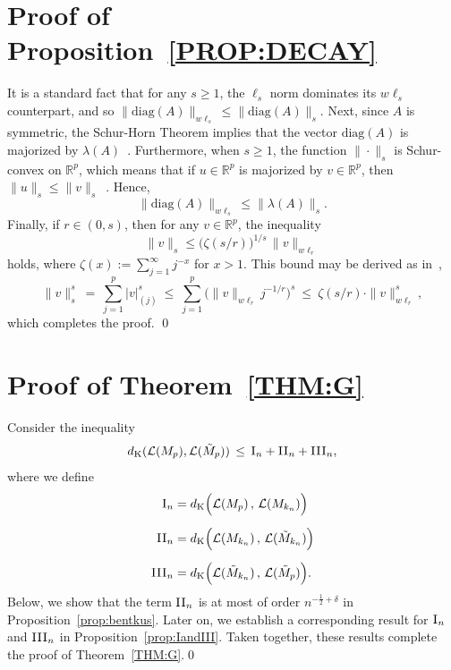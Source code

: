 \documentclass[aos,preprint]{imsart}
\numberwithin{equation}{section}
\theoremstyle{plain}
\newcommand{\R}{\mathbb{R}}
\newcommand{\I}{\textsc{I}}
\newcommand{\II}{\textsc{II}}
\newcommand{\III}{\textsc{III}}
\newcommand{\1}{{\bf{1}}}
\newcommand{\0}{\mathbf{0}}
\begin{document}
\appendix


\section{Proof of Proposition~\ref{PROP:DECAY}} \label{app:intro}
\proof 
It is a standard fact that for any $s\geq 1$, the $\ell_s$ norm dominates its $w\ell_s$ counterpart, and so
$\|\text{diag}(A)\|_{w\ell_s}\leq \|\text{diag}(A)\|_s$.
Next, since $A$ is symmetric, the Schur-Horn Theorem implies that the vector $\text{diag}(A)$ is majorized by $\lambda(A)$~\cite[p.300]{Olkin:2011}. Furthermore, when $s\geq 1$, the function $\|\cdot \|_s$ is Schur-convex on $\R^p$, which means that if  $u\in\R^p$ is majorized by $v\in\R^p$, then $\|u\|_s\leq \|v\|_s$~\cite[p.138]{Olkin:2011}. Hence,
%
$$\|\text{diag}(A)\|_{w\ell_s}\leq \| \lambda(A)\|_s.$$
%
Finally, if $r\in(0,s)$, then for any $v\in\R^p$, the inequality 
$$\|v\|_s \leq \big(\zeta(s/r)\big)^{1/s}\,\|v\|_{w\ell_r}$$ 
holds, where $\zeta(x):=\sum_{j=1}^{\infty}j^{-x}$ for $x>1$. This bound may be derived as in~\citep[p.257]{Johnstone:2017}, 
%
$$\|v\|_s^s \ = \ \sum_{j=1}^p |v|_{(j)}^s \ \leq \ \sum_{j=1}^p \big(\|v\|_{w\ell_r} j^{-1/r}\big)^s \ \leq \ \zeta(s/r)\cdot \|v\|_{w\ell_r}^s,
$$
which completes the proof.
\qed
%
%
%
%
%

\section{Proof of Theorem~\ref{THM:G}}\label{app:thmg}

\proof Consider the inequality
\begin{equation}
d_{\textup{K}}(\mathcal{L}(M_p),\mathcal{L}(\tilde{M}_p)) \, \leq \, \I_n+\II_n+\III_n,
\end{equation}
where we define
\begin{align}
\I_n &= d_{\text{K}}\Big(\mathcal{L}(M_p) \, , \, \mathcal{L}(M_{k_n})\Big)\\[0.2cm]
%
\II_n &=d_{\text{K}}\Big( \mathcal{L}(M_{k_n})\, , \, \mathcal{L}(\tilde M_{k_n})\Big)\\[0.2cm]
%
\III_n &=d_{\text{K}}\Big( \mathcal{L}(\tilde M_{k_n})\, ,\, \mathcal{L}(\tilde M_p)\Big).\label{eqn:IIIdef}
\end{align}
%
Below, we show that the term $\II_n$ is at most of order $n^{-\frac{1}{2}+\delta}$ in Proposition~\ref{prop:bentkus}. Later on, we establish a corresponding result for $\I_n$ and $\III_n$ in Proposition~\ref{prop:IandIII}. Taken together, these results complete the proof of Theorem~\ref{THM:G}.\qed
\end{document}
